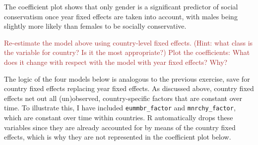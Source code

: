 \documentclass[
]{article}
\begin{document}
The coefficient plot shows that only gender is a significant predictor
of social conservatism once year fixed effects are taken into account,
with males being slightly more likely than females to be socially
conservative.

\textcolor{brown}{Re-estimate the model above using country-level fixed effects. (Hint: what class is the variable for country? Is it the most appropriate?) Plot the coefficients: What does it change with respect with the model with year fixed effects? Why?}

The logic of the four models below is analogous to the previous
exercise, save for country fixed effects replacing year fixed effects.
As discussed above, country fixed effects net out all (un)observed,
country-specific factors that are constant over time. To illustrate
this, I have included \texttt{eummbr\_factor} and
\texttt{mnrchy\_factor}, which are constant over time within countries.
R automatically drops these variables since they are already accounted
for by means of the country fixed effects, which is why they are not
represented in the coefficient plot below.
\end{document}
